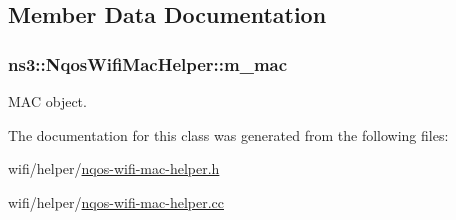 \subsection{Member Data Documentation}
\subsubsection[{\texorpdfstring{m\+\_\+mac}{m_mac}}]{ ns3\+::\+Nqos\+Wifi\+Mac\+Helper\+::m\+\_\+mac\hspace{0.3cm}{\ttfamily [protected]}}\hypertarget{classns3_1_1NqosWifiMacHelper_ae4437169b30d744eaa8ebda79a66ec59}{}\label{classns3_1_1NqosWifiMacHelper_ae4437169b30d744eaa8ebda79a66ec59}


M\+AC object. 



The documentation for this class was generated from the following files\+:\begin{DoxyCompactItemize}
\item 
wifi/helper/\hyperlink{nqos-wifi-mac-helper_8h}{nqos-\/wifi-\/mac-\/helper.\+h}\item 
wifi/helper/\hyperlink{nqos-wifi-mac-helper_8cc}{nqos-\/wifi-\/mac-\/helper.\+cc}\end{DoxyCompactItemize}
